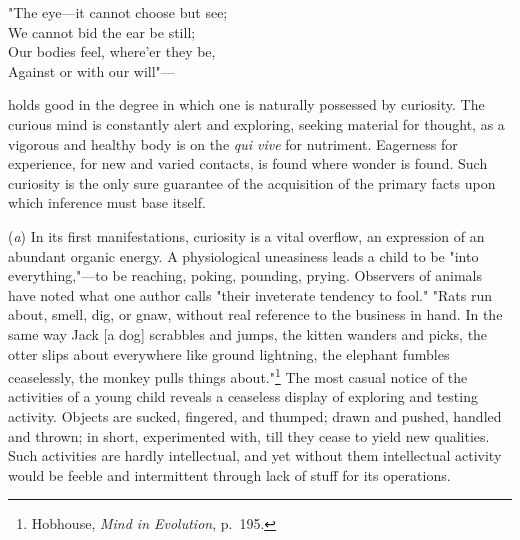 \documentclass[showtrims,ustradepaper]{memoir}
\begin{document}
{"The eye---it cannot choose but see;\\
} {We cannot bid the ear be still;\\
} {Our bodies feel, where'er they be,\\
} {Against or with our will"---\\
}

holds good in the degree in which one is naturally possessed by
curiosity. The curious mind is constantly alert and exploring, seeking
material for thought, as a vigorous and healthy body is on the \emph{qui
vive} for nutriment. Eagerness for experience, for new and varied
contacts, is found where wonder is found. Such curiosity is the only
sure guarantee of the acquisition of the primary facts upon which
inference must base itself.


(\emph{a}) In its first manifestations, curiosity is a vital overflow,
an expression of an abundant organic energy. A physiological uneasiness
leads a child to be "into everything,"---to be reaching, poking,
pounding, prying. Observers of animals have noted what one author calls
"their inveterate tendency to fool." "Rats run about, smell, dig, or
gnaw, without real reference to the business in hand. In the same way
Jack {[}a dog{]} scrabbles and jumps, the kitten wanders and picks, the
otter slips about everywhere like ground lightning, the elephant fumbles
ceaselessly, the monkey pulls things
about."\footnote{Hobhouse, \emph{Mind in Evolution}, p.\ 195. }
The most casual notice of the activities of a young child reveals a
ceaseless display of exploring and testing activity. Objects are sucked,
fingered, and thumped; drawn and pushed, handled and thrown; in short,
experimented
with, till they cease to yield new qualities. Such activities are hardly
intellectual, and yet without them intellectual activity would be feeble
and intermittent through lack of stuff for its operations.

\end{document}
